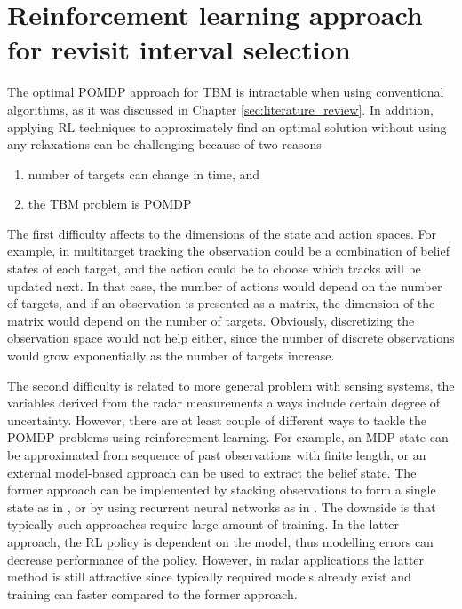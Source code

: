 \documentclass[english, 12pt, a4paper, elec, utf8, a-1b, online]{aaltothesis}
\begin{document}
\newpage
\section{Reinforcement learning approach for revisit interval selection}

The optimal POMDP approach for TBM is intractable when using conventional algorithms, as it was discussed in Chapter \ref{sec:literature_review}. 
In addition, applying RL techniques to approximately find an optimal solution without using any relaxations can be challenging because of two reasons
\begin{enumerate}
    \item number of targets can change in time, and
    \item the TBM problem is POMDP
\end{enumerate}
The first difficulty affects to the dimensions of the state and action spaces. 
For example, in multitarget tracking the observation could be a combination of belief states of each target, and the action could be to choose which tracks will be updated next.
In that case, the number of actions would depend on the number of targets, and if an observation is presented as a matrix, the dimension of the matrix would depend on the number of targets.
Obviously, discretizing the observation space would not help either, since the number of discrete observations would grow exponentially as the number of targets increase.

The second difficulty is related to more general problem with sensing systems,
the variables derived from the radar measurements always include certain degree of uncertainty.
However, there are at least couple of different ways to tackle the POMDP problems using reinforcement learning.
For example, an MDP state can be approximated from sequence of past observations with finite length, or an external model-based approach can be used to extract the belief state.
The former approach can be implemented by stacking observations to form a single state as in \cite{Mnih2013}, or by using recurrent neural networks as in \cite{Hausknecht2015}.
The downside is that typically such approaches require large amount of training.
In the latter approach, the RL policy is dependent on the model, thus modelling errors can decrease performance of the policy.
However, in radar applications the latter method is still attractive since typically required models already exist and training can faster compared to the former approach.
\end{document}
